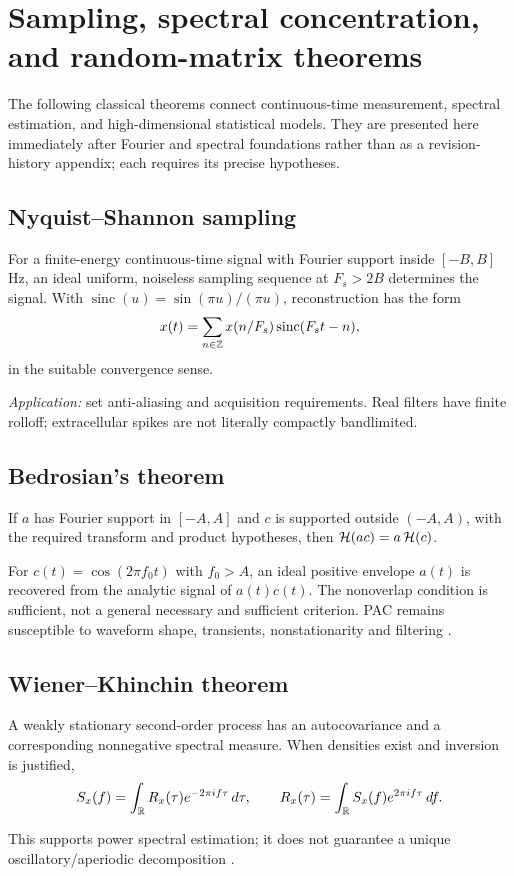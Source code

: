 \chapter[Classical sampling and random matrices]{Sampling, spectral concentration, and random-matrix theorems}
The following classical theorems connect continuous-time measurement,
spectral estimation, and high-dimensional statistical models. They are
presented here immediately after Fourier and spectral foundations rather
than as a revision-history appendix; each requires its precise hypotheses.

\section{Nyquist--Shannon sampling}
\begin{theorem}
For a finite-energy continuous-time signal with Fourier support
inside $[-B,B]$ Hz, an ideal uniform, noiseless sampling sequence at
$F_s>2B$ determines the signal. With
$\operatorname{sinc}(u)=\sin(\pi u)/(\pi u)$, reconstruction has the form
\[
x(t)=\sum_{n\in\mathbb{Z}}x(n/F_s)\operatorname{sinc}(F_st-n),
\]
in the suitable convergence sense.
\end{theorem}
\emph{Application:} set anti-aliasing and acquisition requirements.
Real filters have finite rolloff; extracellular spikes are not
literally compactly bandlimited.

\section{Bedrosian's theorem}
\begin{theorem}
If $a$ has Fourier support in $[-A,A]$ and $c$ is supported
outside $(-A,A)$, with the required transform and product
hypotheses, then $\mathcal{H}(ac)=a\,\mathcal{H}(c)$.
\end{theorem}
For $c(t)=\cos(2\pi f_0t)$ with $f_0>A$, an ideal positive envelope
$a(t)$ is recovered from the analytic signal of $a(t)c(t)$.
The nonoverlap condition is sufficient, not a general necessary and
sufficient criterion. PAC remains susceptible to waveform shape,
transients, nonstationarity and filtering \cite{aru2015,cole2019}.

\section{Wiener--Khinchin theorem}
\begin{theorem}
A weakly stationary second-order process has an autocovariance and
a corresponding nonnegative spectral measure. When densities
exist and inversion is justified,
\[
S_x(f)=\int_{\mathbb{R}}R_x(\tau)e^{-2\pi if\tau}\,d\tau,\qquad
R_x(\tau)=\int_{\mathbb{R}}S_x(f)e^{2\pi if\tau}\,df.
\]
\end{theorem}
This supports power spectral estimation; it does not guarantee a unique
oscillatory/aperiodic decomposition \cite{donoghue2020,gerster2022}.

